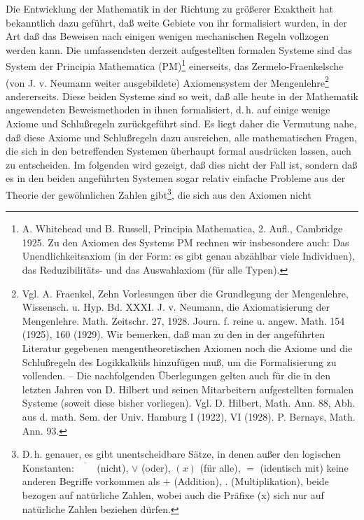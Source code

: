 \documentclass[draft]{scrartcl}
\begin{document}
Die Entwicklung der Mathematik in der Richtung zu 
größerer
Exaktheit hat bekanntlich dazu geführt, daß weite Gebiete
von ihr formalisiert wurden, in der Art daß das Beweisen
nach einigen wenigen mechanischen Regeln vollzogen werden
kann. Die umfassendsten derzeit aufgestellten formalen 
Systeme sind das System der Principia Mathematica 
(PM)\footnote{A. Whitehead und B. Russell, Principia
Mathematica, 2. Aufl., Cambridge 1925. Zu den Axiomen 
des Systems PM rechnen wir insbesondere auch: 
Das Unendlichkeitsaxiom (in der Form: es gibt 
genau abzählbar viele Individuen), 
das Reduzibilitäts- und das Auswahlaxiom (für alle 
Typen).} einerseits, das Zermelo-Fraenkelsche
(von J. v. Neumann weiter ausgebildete) Axiomensystem
der Mengenlehre\footnote{Vgl. A. Fraenkel, Zehn
Vorlesungen über die Grundlegung der Mengenlehre,
Wissensch. u. Hyp. Bd. XXXI. J. v. Neumann, die
Axiomatisierung der Mengenlehre. Math. Zeitschr. 27, 
1928. Journ. f. reine u. angew. Math. 154 (1925), 
160 (1929). Wir bemerken, daß man zu den in der
angeführten Literatur gegebenen mengentheoretischen
Axiomen noch die Axiome und die Schlußregeln des
Logikkalküls hinzufügen muß, um die Formalisierung 
zu vollenden. -- Die nachfolgenden Überlegungen gelten
auch für die in den letzten Jahren von D. Hilbert und
seinen Mitarbeitern aufgestellten formalen Systeme 
(soweit diese bisher vorliegen). Vgl. D. Hilbert,
Math. Ann. 88, Abh. aus d. math. Sem. der Univ. 
Hamburg I (1922), VI (1928). P. Bernays, Math. Ann. 93.} 
andererseits. Diese beiden Systeme sind so weit, daß 
alle heute in der Mathematik angewendeten 
Beweismethoden in ihnen formalisiert, d.\,h. auf
einige wenige Axiome und Schlußregeln zurückgeführt sind.
Es liegt daher die Vermutung nahe, daß diese Axiome
und Schlußregeln dazu ausreichen, alle mathematischen
Fragen, die sich in den betreffenden Systemen überhaupt
formal ausdrücken lassen, auch zu entscheiden. Im folgenden
wird gezeigt, daß dies nicht der Fall ist, sondern daß 
es in den beiden angeführten Systemen sogar relativ 
einfache Probleme aus der Theorie der gewöhnlichen Zahlen
gibt\footnote{\label{fussnote4}D.\,h. genauer, es gibt unentscheidbare
Sätze, in denen außer den logischen Konstanten:
$\overline{\phantom{XX}}$ (nicht), $\lor$ (oder), 
$\left(x\right)$ (für alle), $=$ (identisch mit) keine anderen 
Begriffe vorkommen als $+$ (Addition), $.$ 
(Multiplikation), beide bezogen auf natürliche Zahlen,
wobei auch die Präfixe (x) sich nur auf natürliche Zahlen beziehen dürfen.}, die sich aus den Axiomen nicht 
\end{document}
